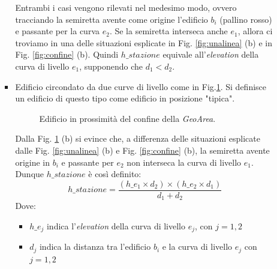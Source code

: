 \begin{enumerate}
\begin{enumerate}
\begin{itemize}
Entrambi i casi vengono rilevati nel medesimo modo, ovvero tracciando la semiretta avente come origine l'edificio $b_i$ (pallino rosso) e passante per la curva $e_2$. Se la semiretta interseca anche $e_1$, allora ci troviamo in una delle situazioni esplicate in Fig. \ref{fig:unalinea} (b) e in Fig. \ref{fig:confine} (b). Quindi $h\_stazione$ equivale all'\textit{elevation} della curva di livello $e_1$, supponendo che $d_1 < d_2$.

\newpage

\item Edificio circondato da due curve di livello come in Fig.\ref{fig:circondata}. Si definisce un edificio di questo tipo come edificio in posizione "tipica".

\begin{figure}[bth]
\myfloatalign
{} \quad
{} 
\caption[]{Edificio in prossimità del confine della \textit{GeoArea}.}\label{fig:circondata}
\end{figure}

Dalla Fig. \ref{fig:circondata} (b) si evince che, a differenza delle situazioni esplicate dalle Fig. \ref{fig:unalinea} (b) e Fig. \ref{fig:confine} (b), la semiretta avente origine in $b_i$ e passante per $e_2$ non interseca la curva di livello $e_1$.
Dunque $h\_stazione$ è così definito:
\begin{equation}
\label{eq:hstazione}
   h\_stazione = \frac{(h\_e_1 \times d_2) \times ( h\_e_2 \times d_1)}{d_1 +d_2}
\end{equation}
Dove:
\begin{itemize}
\item $h\_e_j$ indica l'\textit{elevation} della curva di livello $e_j$, con $j=1,2$
\item $d_j$ indica la distanza tra l'edificio $b_i$ e la curva di livello $e_j$ con $j=1,2$
\end{itemize}


\end{itemize}
\end{enumerate}
\end{enumerate}

